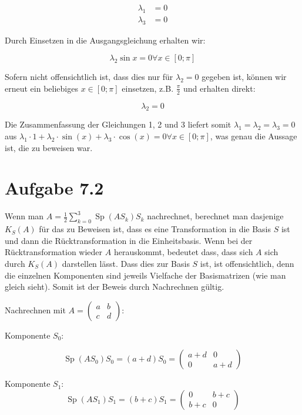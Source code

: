 \documentclass[a4paper,german,12pt,smallheadings]{scrartcl}
\begin{document}
\begin{align}
\lambda_1 &= 0 \\
\lambda_3 &= 0
\end{align}

Durch Einsetzen in die Ausgangsgleichung erhalten wir:

\begin{equation*}
  \lambda_2 \sin x = 0 \forall x \in [0;\pi]
\end{equation*}

Sofern nicht offensichtlich ist, dass dies nur für $\lambda_2 = 0$ gegeben ist,
können wir erneut ein beliebiges $x \in [0;\pi]$ einsetzen, z.B. $\frac{\pi}{2}$
und erhalten direkt:

\begin{equation}
  \lambda_2 = 0
\end{equation}

Die Zusammenfassung der Gleichungen 1, 2 und 3 liefert somit $\lambda_1 =
\lambda_2 = \lambda_3 = 0$ aus $\lambda_1 \cdot 1 + \lambda_2 \cdot \sin(x) +
\lambda_3 \cdot \cos(x) = 0 \forall x \in [0;\pi]$, was genau die Aussage ist,
die zu beweisen war.
\section*{Aufgabe 7.2}
Wenn man $A = \frac{1}{2} \sum_{k=0}^{3} \operatorname{Sp}(AS_k) S_k$
nachrechnet, berechnet man dasjenige $K_S(A)$ für das zu Beweisen ist, dass es
eine Transformation in die Basis $S$ ist und dann die Rücktransformation in die
Einheitsbasis. Wenn bei der Rücktransformation wieder $A$ herauskommt, bedeutet
dass, dass sich $A$ sich durch $K_S(A)$ darstellen lässt. Dass dies zur Basis
$S$ ist, ist offensichtlich, denn die einzelnen Komponenten sind jeweils
Vielfache der Basismatrizen (wie man gleich sieht). Somit ist der Beweis durch
Nachrechnen gültig.

Nachrechnen mit $A = \begin{pmatrix} a & b \\ c & d \end{pmatrix}$:

Komponente $S_0$:

\begin{equation*}
  \operatorname{Sp}(AS_0) S_0 = (a+d) S_0 = \begin{pmatrix} a+d & 0 \\ 0 & a+d \end{pmatrix}
\end{equation*}

Komponente $S_1$:
\begin{equation*}
  \operatorname{Sp}(AS_1) S_1 = (b+c) S_1 = \begin{pmatrix} 0 & b+c \\ b+c & 0 \end{pmatrix}
\end{equation*}
\end{document}
